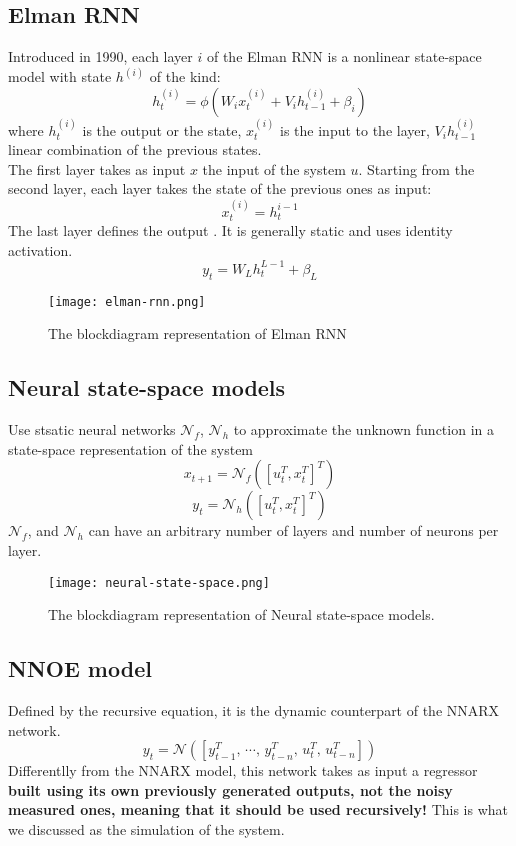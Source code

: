 \subsection{Elman RNN}
Introduced in 1990, each layer $i$ of the Elman RNN is a nonlinear state-space model with state $h^{(i)}$ of the kind:
\[
h_t^{(i)} = \phi(W_ix_t^{(i)} + V_ih_{t-1}^{(i)} + \beta_i)
\]
where $h_t^{(i)} $ is the output or the state, $x_t^{(i)}$ is the input to the layer, $V_ih_{t-1}^{(i)} $  linear combination of the previous states. \\
The first layer takes as input $x$ the input of the system $u$. Starting from the second layer, each layer takes the state of the previous ones as input:
\[
x_t^{(i)} = h_t^{i-1}
\]
The last layer defines the output . It is generally static and uses identity activation.
\[
y_t = W_Lh_t^{L-1} + \beta_L
\]
\begin{figure}[H]
    \centering \texttt{[image: elman-rnn.png]}
    \caption{The blockdiagram representation of Elman RNN}
 \end{figure}

\subsection{Neural state-space models}
Use stsatic neural networks $\mathcal{N}_f$, $\mathcal{N}_h$ to approximate the unknown function in a state-space representation of the system
\[
x_{t+1} = \mathcal{N}_f([u_t^T,x_t^T]^T)
\]
\[
y_t = \mathcal{N}_h([u_t^T,x_t^T]^T)
\]
$\mathcal{N}_f$, and $\mathcal{N}_h$ can have an arbitrary number of layers and number of neurons per layer.

\begin{figure}[H]
    \centering \texttt{[image: neural-state-space.png]}
    \caption{The blockdiagram representation of Neural state-space models.}
 \end{figure}

\subsection{NNOE model}
Defined by the recursive equation, it is the dynamic counterpart of the NNARX network.
\[
y_t = \mathcal{N}([y_{t-1}^T,\,\cdots,\,y_{t-n}^T,\, u_{t}^T,\, u_{t-n}^T])
\]
Differentlly from the NNARX model, this network takes as input a regressor \textbf{built using its own previously generated outputs, not the noisy measured ones, meaning that it should be used recursively!} This is what we discussed as the simulation of the system.


